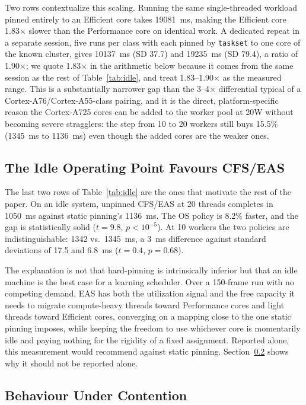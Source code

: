 \documentclass[conference]{IEEEtran}
\begin{document}
Two rows contextualize this scaling. Running the same single-threaded workload pinned entirely to an Efficient core takes 19081~ms, making the Efficient core 1.83$\times$ slower than the Performance core on identical work. A dedicated repeat in a separate session, five runs per class with each pinned by \texttt{taskset} to one core of the known cluster, gives 10137~ms (SD 37.7) and 19235~ms (SD 79.4), a ratio of 1.90$\times$; we quote 1.83$\times$ in the arithmetic below because it comes from the same session as the rest of Table~\ref{tab:idle}, and treat 1.83--1.90$\times$ as the measured range. This is a substantially narrower gap than the 3--4$\times$ differential typical of a Cortex-A76/Cortex-A55-class pairing, and it is the direct, platform-specific reason the Cortex-A725 cores can be added to the worker pool at 20W without becoming severe stragglers: the step from 10 to 20 workers still buys 15.5\% (1345~ms to 1136~ms) even though the added cores are the weaker ones.

\subsection{The Idle Operating Point Favours CFS/EAS}
\label{sec:cfsidle}
The last two rows of Table~\ref{tab:idle} are the ones that motivate the rest of the paper. On an idle system, unpinned CFS/EAS at 20 threads completes in 1050~ms against static pinning's 1136~ms. The OS policy is 8.2\% faster, and the gap is statistically solid ($t=9.8$, $p<10^{-5}$). At 10 workers the two policies are indistinguishable: 1342 vs.\ 1345~ms, a 3~ms difference against standard deviations of 17.5 and 6.8~ms ($t=0.4$, $p=0.68$).

The explanation is not that hard-pinning is intrinsically inferior but that an idle machine is the best case for a learning scheduler. Over a 150-frame run with no competing demand, EAS has both the utilization signal and the free capacity it needs to migrate compute-heavy threads toward Performance cores and light threads toward Efficient cores, converging on a mapping close to the one static pinning imposes, while keeping the freedom to use whichever core is momentarily idle and paying nothing for the rigidity of a fixed assignment. Reported alone, this measurement would recommend against static pinning. Section~\ref{sec:contention} shows why it should not be reported alone.

\subsection{Behaviour Under Contention}
\label{sec:contention}
\end{document}
